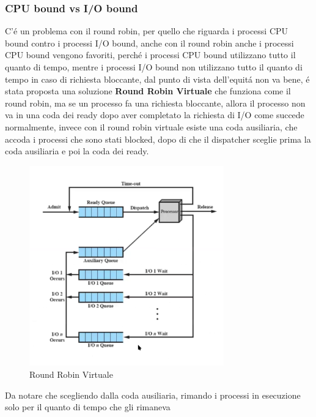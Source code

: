     \subsubsection*{CPU bound vs I/O bound}
    C'é un problema con il round robin, per quello che riguarda i processi CPU bound contro i processi I/O bound,
    anche con il round robin anche i processi CPU bound vengono favoriti, perché i processi CPU bound utilizzano
    tutto il quanto di tempo, mentre i processi I/O bound non utilizzano tutto il quanto di tempo in caso di richiesta
    bloccante, dal punto di vista dell'equitá non va bene, é stata proposta una soluzione \textbf{Round Robin Virtuale}
    che funziona come il round robin, ma se un processo fa una richiesta bloccante, allora il processo non va in una coda
    dei ready dopo aver completato la richiesta di I/O come succede normalmente, invece con il round robin virtuale
    esiste una coda ausiliaria, che accoda i processi che sono stati blocked, dopo di che il dispatcher sceglie prima
    la coda ausiliaria e poi la coda dei ready.
    \begin{figure}
        \centering
        \includegraphics[width=0.75\textwidth]{immagini/RoundRobinVirtuale}
        \caption{Round Robin Virtuale}
    \end{figure}
    Da notare che scegliendo dalla coda ausiliaria, rimando i processi in esecuzione solo per il quanto di tempo che gli rimaneva

